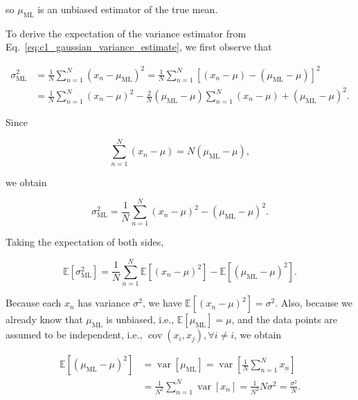 \documentclass[10pt,twocolumn]{memoir}
\begin{document}
so $\mu_{\mathrm{ML}}$ is an unbiased estimator of the true mean.

To derive the expectation of the variance estimator from Eq.~\ref{eq:c1_gaussian_variance_estimate}, we first observe that

\begin{equation}
\begin{aligned}
    \sigma_{\mathrm{ML}}^2 &= \frac{1}{N}\sum_{n=1}^{N} (x_n-\mu_{\mathrm{ML}})^2
    = \frac{1}{N}\sum_{n=1}^{N}\left[(x_n-\mu) - (\mu_{\mathrm{ML}}-\mu)\right]^2 \\
    &= \frac{1}{N}\sum_{n=1}^{N}(x_n-\mu)^2 - \frac{2}{N}(\mu_{\mathrm{ML}}-\mu)\sum_{n=1}^{N}(x_n-\mu) + (\mu_{\mathrm{ML}}-\mu)^2.
\end{aligned}
\end{equation}

Since

\begin{equation}
    \sum_{n=1}^{N}(x_n-\mu) = N(\mu_{\mathrm{ML}}-\mu),
\end{equation}

we obtain

\begin{equation}
    \sigma_{\mathrm{ML}}^2 = \frac{1}{N} \sum_{n=1}^{N}(x_n-\mu)^2 - (\mu_{\mathrm{ML}}-\mu)^2.
\end{equation}

Taking the expectation of both sides,

\begin{equation}
    \mathbb{E}\left[\sigma_{\mathrm{ML}}^2\right] = \frac{1}{N} \sum_{n=1}^{N}\mathbb{E}\left[(x_n-\mu)^2\right] - \mathbb{E}\left[(\mu_{\mathrm{ML}}-\mu)^2\right].
\end{equation}

Because each $x_n$ has variance $\sigma^2$, we have $\mathbb{E}\left[(x_n-\mu)^2\right] = \sigma^2$. Also, because we already know that $\mu_{\mathrm{ML}}$ is unbiased, i.e., $\mathbb{E}\left[\mu_\mathrm{ML}\right] = \mu$, and the data points are assumed to be independent, i.e., $\operatorname{cov}(x_i,x_j), \forall i \neq i$, we obtain

\begin{equation}
\begin{aligned}
    \mathbb{E} \left[(\mu_{\mathrm{ML}}-\mu)^2\right] &= \operatorname{var}[\mu_{\mathrm{ML}}] =
    \operatorname{var}\left[\frac{1}{N}\sum_{n=1}^{N}x_n\right] \\
    &=
    \frac{1}{N^2}\sum_{n=1}^{N}\operatorname{var}[x_n] = \frac{1}{N^2} N\sigma^2 = \frac{\sigma^2}{N}.
\end{aligned}
\end{equation}
\end{document}
